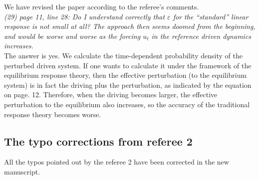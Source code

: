 \documentclass[]{revtex4-1}
\begin{document}
We have revised the paper according to the referee's comments. \\

\emph{
(29) page 11, line 28: Do I understand correctly that $\varepsilon$ for the “standard” linear response is
not small at all? The approach then seems doomed from the beginning, and would be
worse and worse as the forcing $u_t$ in the reference driven dynamics increases.
}\\

The answer is yes. We calculate the time-dependent probability density of
the perturbed driven system. If one wants to calculate it  under the
framework of the equilibrium response theory, then the effective perturbation
(to the equilibrium system) is in fact the driving plus the perturbation, as
indicated by the equation on page. 12. Therefore, when the driving 
becomes larger, the effective perturbation to the equilibrium also increases, so the
accuracy of the traditional response theory becomes worse.



\subsection*{The typo corrections from referee 2}

All the typos pointed out by the referee 2 have been corrected in the new manuscript.
\end{document}
